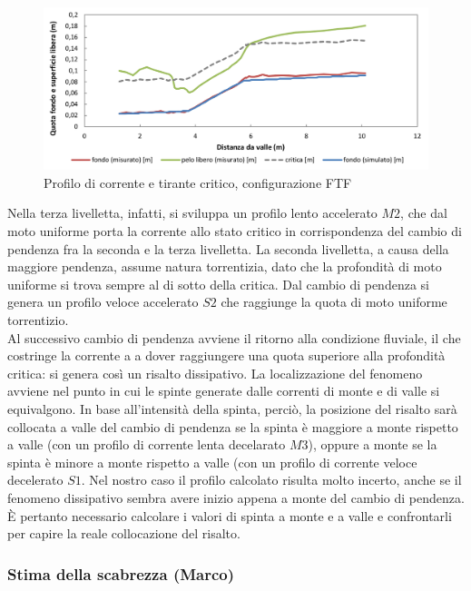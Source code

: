\documentclass[12pt]{article} %
\begin{document}
\begin{figure}[H]
    \centering
    \includegraphics[width=\textwidth]{FTFbasecritica.png}
    \caption{Profilo di corrente e tirante critico, configurazione FTF}
    \label{fig:critica_FTF}
\end{figure}

\noindent  Nella terza livelletta, infatti, si sviluppa un profilo lento accelerato $M2$, che dal moto uniforme porta la corrente allo stato critico in corrispondenza del cambio di pendenza fra la seconda e la terza livelletta. La seconda livelletta, a causa della maggiore pendenza, assume natura torrentizia, dato che la profondità di moto uniforme si trova sempre al di sotto della critica. Dal cambio di pendenza si genera un profilo veloce accelerato $S2$ che raggiunge la quota di moto uniforme torrentizio. \\
Al successivo cambio di pendenza avviene il ritorno alla condizione fluviale, il che costringe la corrente a a dover raggiungere una quota superiore alla profondità critica: si genera così un risalto dissipativo. La localizzazione del fenomeno avviene nel punto in cui le spinte generate dalle correnti di monte e di valle si equivalgono. In base all'intensità della spinta, perciò, la posizione del risalto sarà collocata a valle del cambio di pendenza se la spinta è maggiore a monte rispetto a valle (con un profilo di corrente lenta decelarato $M3$), oppure a monte se la spinta è minore a monte rispetto a valle (con un profilo di corrente veloce decelerato $S1$.
Nel nostro caso il profilo calcolato risulta molto incerto, anche se il fenomeno dissipativo sembra avere inizio appena a monte del cambio di pendenza. È pertanto necessario calcolare i valori di spinta a monte e a valle e confrontarli per capire la reale collocazione del risalto.

\subsubsection{Stima della scabrezza (Marco)} 
\end{document}
